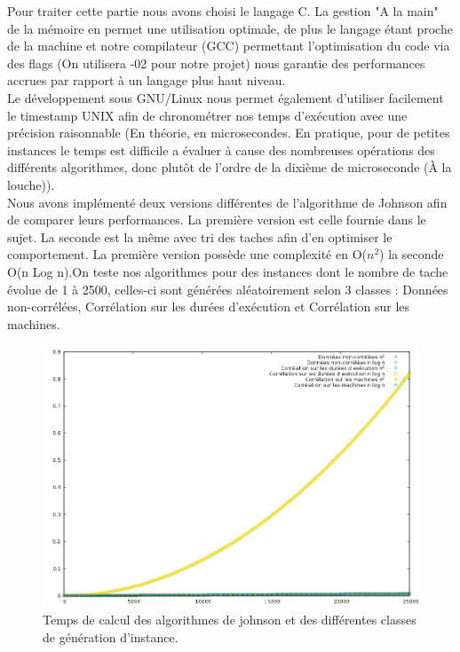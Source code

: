 \documentclass[12pt]{article}
\begin{document}
Pour traiter cette partie nous avons choisi le langage C. La gestion "A la main" de la mémoire en permet une utilisation optimale, de plus le langage étant proche de la machine et notre compilateur (GCC) permettant l'optimisation du code via des flags (On utilisera -02 pour notre projet) nous garantie des performances accrues par rapport à un langage plus haut niveau. \\

Le développement sous GNU/Linux nous permet également d'utiliser facilement le timestamp UNIX afin de chronométrer nos temps d'exécution avec une précision raisonnable (En théorie, en microsecondes. En pratique, pour de petites instances le temps est difficile a évaluer à cause des nombreuses opérations des différents algorithmes, donc plutôt de l'ordre de la dixième de microseconde (À la louche)).\\

Nous avons implémenté deux versions différentes de l'algorithme de Johnson afin de comparer leurs performances. La première version est celle fournie dans le sujet. La seconde est la même avec tri des taches afin d'en optimiser le comportement. La première version possède une complexité en O($n^2$) la seconde O(n Log n).On teste nos algorithmes pour des instances dont le nombre de tache évolue de 1 à 2500, celles-ci sont générées aléatoirement selon 3 classes : Données non-corrélées, Corrélation sur les durées d'exécution et Corrélation sur les machines.\\

\begin{figure}[!ht]
\centering
\centerline{\includegraphics[scale=0.7]{johnson.png}}
\caption{Temps de calcul des algorithmes de johnson et des différentes classes de génération d'instance.}
\label{john}
\end{figure}
\end{document}
